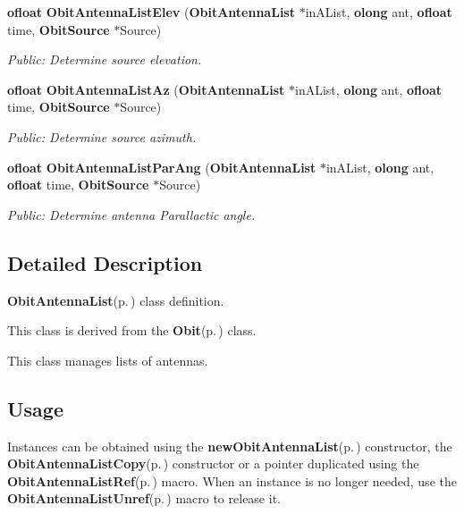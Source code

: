 \begin{CompactItemize}
{\bf ofloat} {\bf Obit\-Antenna\-List\-Elev} ({\bf Obit\-Antenna\-List} $\ast$in\-AList, {\bf olong} ant, {\bf ofloat} time, {\bf Obit\-Source} $\ast$Source)
\begin{CompactList}\small\item\em Public: Determine source elevation. \item\end{CompactList}\item 
{\bf ofloat} {\bf Obit\-Antenna\-List\-Az} ({\bf Obit\-Antenna\-List} $\ast$in\-AList, {\bf olong} ant, {\bf ofloat} time, {\bf Obit\-Source} $\ast$Source)
\begin{CompactList}\small\item\em Public: Determine source azimuth. \item\end{CompactList}\item 
{\bf ofloat} {\bf Obit\-Antenna\-List\-Par\-Ang} ({\bf Obit\-Antenna\-List} $\ast$in\-AList, {\bf olong} ant, {\bf ofloat} time, {\bf Obit\-Source} $\ast$Source)
\begin{CompactList}\small\item\em Public: Determine antenna Parallactic angle. \item\end{CompactList}\end{CompactItemize}


\subsection{Detailed Description}
{\bf Obit\-Antenna\-List}{\rm (p.\,\pageref{structObitAntennaList})} class definition. 

This class is derived from the {\bf Obit}{\rm (p.\,\pageref{structObit})} class.

This class manages lists of antennas.\subsection{Usage}\label{ObitAntennaList_8h_ObitAntennaListUsage}
Instances can be obtained using the {\bf new\-Obit\-Antenna\-List}{\rm (p.\,\pageref{ObitAntennaList_8c_a6})} constructor, the {\bf Obit\-Antenna\-List\-Copy}{\rm (p.\,\pageref{ObitAntennaList_8c_a9})} constructor or a pointer duplicated using the {\bf Obit\-Antenna\-List\-Ref}{\rm (p.\,\pageref{ObitAntennaList_8h_a1})} macro. When an instance is no longer needed, use the {\bf Obit\-Antenna\-List\-Unref}{\rm (p.\,\pageref{ObitAntennaList_8h_a0})} macro to release it.

